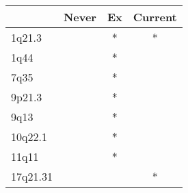 \begin{tabular}{lccc}
\toprule
{} & Never & Ex & Current \\
\midrule
1q21.3   &       &  * &       * \\
1q44     &       &  * &         \\
7q35     &       &  * &         \\
9p21.3   &       &  * &         \\
9q13     &       &  * &         \\
10q22.1  &       &  * &         \\
11q11    &       &  * &         \\
17q21.31 &       &    &       * \\
\bottomrule
\end{tabular}
